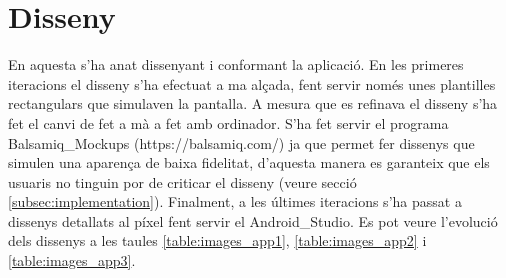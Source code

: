 \section{Disseny}
En aquesta s'ha anat dissenyant i conformant la aplicació. En les primeres iteracions el disseny s'ha efectuat a ma alçada, fent servir només unes plantilles rectangulars que simulaven la pantalla. A mesura que es refinava el disseny s'ha fet el canvi de fet a mà a fet amb ordinador. S'ha fet servir el programa \gls{Balsamiq_Mockups} (https://balsamiq.com/) ja que permet fer dissenys que simulen una aparença de baixa fidelitat, d'aquesta manera es garanteix que els usuaris no tinguin por de criticar el disseny (veure secció \ref{subsec:implementation}). Finalment, a les últimes iteracions s'ha passat a dissenys detallats al píxel fent servir el \gls{Android_Studio}. Es pot veure l'evolució dels dissenys a les taules \ref{table:images_app1}, \ref{table:images_app2} i \ref{table:images_app3}.

